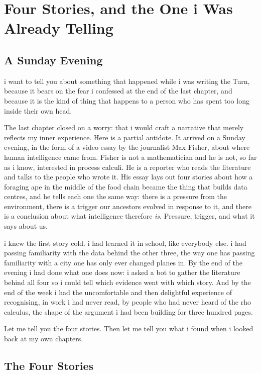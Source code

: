 \chapter{Four Stories, and the One i Was Already Telling}
\label{chap:pledge-ch5}

\section{A Sunday Evening}
\label{sec:pledge-stories}

i want to tell you about something that happened while i was writing the Turn, because it bears on the fear i confessed at the end of the last chapter, and because it is the kind of thing that happens to a person who has spent too long inside their own head.

The last chapter closed on a worry: that i would craft a narrative that merely reflects my inner experience. Here is a partial antidote. It arrived on a Sunday evening, in the form of a video essay by the journalist Max Fisher, about where human intelligence came from. Fisher is not a mathematician and he is not, so far as i know, interested in process calculi. He is a reporter who reads the literature and talks to the people who wrote it. His essay lays out four stories about how a foraging ape in the middle of the food chain became the thing that builds data centres, and he tells each one the same way: there is a pressure from the environment, there is a trigger our ancestors evolved in response to it, and there is a conclusion about what intelligence therefore \emph{is}. Pressure, trigger, and what it says about us.

i knew the first story cold. i had learned it in school, like everybody else. i had passing familiarity with the data behind the other three, the way one has passing familiarity with a city one has only ever changed planes in. By the end of the evening i had done what one does now: i asked a bot to gather the literature behind all four so i could tell which evidence went with which story. And by the end of the week i had the uncomfortable and then delightful experience of recognising, in work i had never read, by people who had never heard of the rho calculus, the shape of the argument i had been building for three hundred pages.

Let me tell you the four stories. Then let me tell you what i found when i looked back at my own chapters.

\section{The Four Stories}

